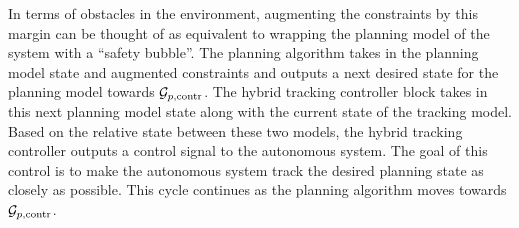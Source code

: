 In terms of obstacles in the environment, augmenting the constraints by this margin can be thought of as equivalent to wrapping the planning model of the system with a ``safety bubble''. 
The planning algorithm takes in the planning model state and augmented constraints and outputs a next desired state for the planning model towards $\mathcal G_{p,\text{contr}}$.
The hybrid tracking controller block takes in this next planning model state along with the current state of the tracking model.
Based on the relative state between these two models, the hybrid tracking controller outputs a control signal to the autonomous system. 
The goal of this control is to make the autonomous system track the desired planning state as closely as possible.
This cycle continues as the planning algorithm moves towards $\mathcal G_{p,\text{contr}}$.




